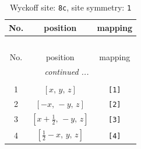 \documentclass[fleqn,8pt]{jsarticle}
\begin{document}
\renewcommand{\arraystretch}{1.2}
\begin{longtable}{ccc}
\caption{Wyckoff site: {\tt 8c}, site symmetry: {\tt 1}}
 \\
 \hline \hline
No. & position & mapping \\ \hline \endfirsthead

\multicolumn{2}{l}{\tablename\ \thetable{}} \\
 \hline \hline
No. & position & mapping \\ \hline \endhead

 \hline \hline
\multicolumn{2}{r}{\footnotesize\it continued ...} \\ \endfoot

 \hline \hline
\multicolumn{2}{r}{} \\ \endlastfoot

1 & $\left[ x,\, y,\, z \right]$ & {\tt [1]} \\ \hline
2 & $\left[ - x,\, - y,\, z \right]$ & {\tt [2]} \\ \hline
3 & $\left[ x + \frac{1}{2},\, - y,\, z \right]$ & {\tt [3]} \\ \hline
4 & $\left[ \frac{1}{2} - x,\, y,\, z \right]$ & {\tt [4]} \\
\end{longtable}
\end{document}

